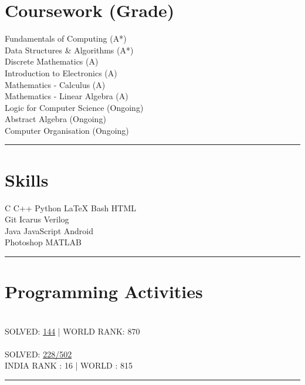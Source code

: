 \documentclass[letterpaper]{Formatting}
\begin{document}
\begin{minipage}[t]{0.3\textwidth}

\section{Coursework (Grade)}
Fundamentals of Computing (A*)\\
Data Structures \& Algorithms (A*)\\
Discrete Mathematics (A)\\
Introduction to Electronics (A)\\
Mathematics - Calculus (A)\\
Mathematics - Linear Algebra (A)\\
Logic for Computer Science (Ongoing)\\
Abstract Algebra (Ongoing)\\
Computer Organisation (Ongoing)\\
\sectionspace %
\vspace{-1ex}
\rule{5cm}{0.5pt}
\vspace{2ex}

\section{Skills}


C \textbullet{} C++ \textbullet{} Python \textbullet{} \LaTeX \textbullet{} Bash \textbullet{} HTML\\
Git \textbullet{} Icarus Verilog \\
Java \textbullet{} JavaScript \textbullet{} Android\\
Photoshop \textbullet{} MATLAB
\sectionspace %
\vspace{-1.5ex}
\rule{5cm}{0.5pt}
\vspace{2ex}


\section{Programming Activities}
\\\vspace{0.5ex}
\small\uppercase {Solved: }\href{http://www.spoj.com/users/rbavishi/}{144} | \uppercase{World Rank: 870}\\
\vspace{2ex}
\\\vspace{0.5ex}
\small \uppercase{Solved: }\href{https://projecteuler.net/profile/RJBavishi.png}{228/502} \\
\small \uppercase{India Rank : 16 | World : 815}
\vspace{1ex}
\rule{5cm}{0.5pt}
\vspace{2ex}


\end{minipage}
\end{document}
